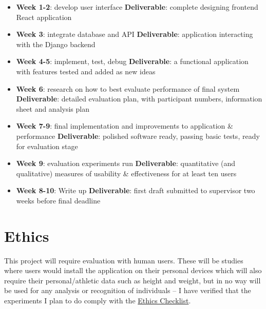 \documentclass[11pt]{article}
\begin{document}
\begin{itemize}
    \tightlist
    \item
      \textbf{Week 1-2}: develop user interface\newline
      \textbf{Deliverable}: complete designing frontend React application
    \item
      \textbf{Week 3}: integrate database and API\newline
      \textbf{Deliverable}: application interacting with the Django backend
    \item
      \textbf{Week 4-5}: implement, test, debug\newline
      \textbf{Deliverable}: a functional application with features tested and added as new ideas
    \item
      \textbf{Week 6}: research on how to best evaluate performance of final system\newline
      \textbf{Deliverable}: detailed evaluation plan, with participant numbers, information sheet and analysis plan
    \item
      \textbf{Week 7-9}: final implementation and improvements to application \& performance\newline
      \textbf{Deliverable}: polished software ready, passing basic tests, ready for evaluation stage
    \item
      \textbf{Week 9}: evaluation experiments run\newline
      \textbf{Deliverable}: quantitative (and qualitative) measures of usability \& effectiveness for at least ten users
    \item
      \textbf{Week 8-10}: Write up\newline
      \textbf{Deliverable}: first draft submitted to supervisor two weeks before final deadline
    \end{itemize}

\section{Ethics}

This project will require evaluation with human users. These will be studies where users would install the application on their personal devices which will also require their personal/athletic data such as height and weight, but in no way will be used for any analysis or recognition of individuals -- I have verified that the experiments I plan to do comply with the \href{https://www.dcs.gla.ac.uk/ethics}{Ethics Checklist}.
\end{document}
